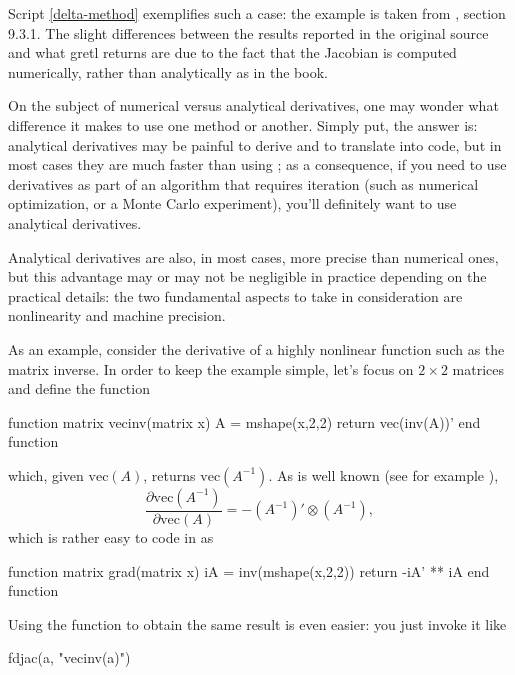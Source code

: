 Script \ref{delta-method} exemplifies such a case: the example is
taken from \cite{greene03}, section 9.3.1. The slight differences
between the results reported in the original source and what
gretl returns are due to the fact that the Jacobian is computed
numerically, rather than analytically as in the book.

On the subject of numerical versus analytical derivatives, one may
wonder what difference it makes to use one method or another. Simply
put, the answer is: analytical derivatives may be painful to derive
and to translate into code, but in most cases they are much faster
than using ; as a consequence, if you need to use
derivatives as part of an algorithm that requires iteration (such as
numerical optimization, or a Monte Carlo experiment), you'll
definitely want to use analytical derivatives.

Analytical derivatives are also, in most cases, more precise than
numerical ones, but this advantage may or may not be negligible in
practice depending on the practical details: the two fundamental
aspects to take in consideration are nonlinearity and machine precision.

As an example, consider the derivative of a highly nonlinear function
such as the matrix inverse. In order to keep the example simple, let's
focus on $2 \times 2$ matrices and define the function
\begin{code}
function matrix vecinv(matrix x)
    A = mshape(x,2,2)
    return vec(inv(A))'
end function
\end{code}
which, given $\mathrm{vec}(A)$, returns $\mathrm{vec}(A^{-1})$. As is
well known (see for example \cite{magneu88}),
\[
  \frac{\partial \mathrm{vec}(A^{-1})}{\partial \mathrm{vec}(A)} 
  = - (A^{-1})' \otimes (A^{-1}),
\]
which is rather easy to code in  as
\begin{code}
function matrix grad(matrix x)
    iA = inv(mshape(x,2,2))
    return -iA' ** iA
end function  
\end{code}
Using the  function to obtain the same result is even
easier: you just invoke it like
\begin{code}
fdjac(a, "vecinv(a)")  
\end{code}

